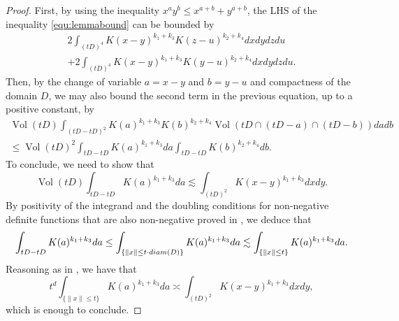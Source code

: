 \documentclass[12pt]{article}
\DeclareMathOperator{\1}{1}
\DeclareMathOperator{\vol}{Vol}
\theoremstyle{plain}
\theoremstyle{definition}
\begin{document}
\begin{proof} %
    First, by using the inequality $x^ay^b\le x^{a+b}+y^{a+b}$, the LHS of the inequality \eqref{equ:lemmabound} can be bounded by 
\begin{multline}
    2 \int_{(tD)^4} K(x-y)^{k_1+k_3} K(z-u)^{k_2+k_4} dx  dy  dz  du \\ + 2 \int_{(tD)^4} K(x-y)^{k_1+k_3} K(y-u)^{k_2+k_4} dx  dy  dz  du.
\end{multline}    
Then, by the change of variable $a=x-y$ and $b=y-u$ and compactness of the domain $D$, we may also bound the second term in the previous equation, up to a positive constant, by
\begin{multline}
\vol(tD)\int_{(tD - tD)^2} K(a)^{k_1+k_3} K(b)^{k_2+k_4}  \vol(tD \cap (tD-a) \cap (tD-b))  da db \\ \le
    \vol(tD)^2 \int_{tD -  tD}K(a)^{k_1+k_3}da \int_{tD -   tD}K(b)^{k_2+k_4}db.
\end{multline}
To conclude, we need to show that \begin{equation}
    \vol (tD) \int_{tD - tD}K(a)^{k_1+k_3}da \lesssim \int_{(tD)^2} K(x-y)^{k_1+k_3}dxdy.
\end{equation}
By positivity of the integrand and the doubling conditions for non-negative definite functions that are also non-negative proved in \cite{Gorbachev}, we deduce that \begin{equation}
       \int_{tD - tD}K(a)^{k_1+k_3}da \le \int_{\{\|x\|\le t\cdot {\rm diam}(D)\} } K(a)^{k_1+k_3}da \lesssim \int_{\{\|x\|\le t \}}K(a)^{k_1+k_3}da.
\end{equation}
Reasoning as in \cite[Proof of Proposition 9, Step 1]{MN22}, we have that \begin{equation}\label{equ:remQuotients}
    t^d\int_{\{\|x\|\le t \}}K(a)^{k_1+k_3}da \asymp \int_{(tD)^2} K(x-y)^{k_1+k_3}dxdy,
\end{equation}
which is enough to conclude.
\end{proof}

%
\end{document}
